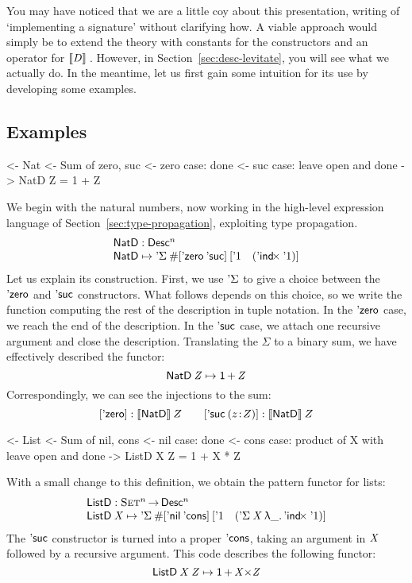 You may have noticed that we are a little coy about this presentation,
writing of `implementing a signature' without clarifying how. A viable
approach would simply be to extend the theory with constants for the
constructors and an operator for \(\descop{\V{D}}\). However, in
Section~\ref{sec:desc-levitate}, you will see what we actually do.  In
the meantime, let us first gain some intuition for its use by
developing some examples.

\subsection{Examples}
\label{sec:desc-examples}

\begin{wstructure}
<- Nat
    <- Sum of zero, suc
    <- zero case: done
    <- suc case: leave open and done
    -> NatD Z = 1 + Z
\end{wstructure}

We begin with the natural numbers, now working in the high-level
expression language of Section~\ref{sec:type-propagation}, exploiting
type propagation.
%
\[\stk{
\NatD : \Desc^n \\
\NatD \mapsto \DSigma{\EnumT{\sqr{\NatZero\: \SYMBNatSuc }}}
                     {\sqr{ \DUnit \quad (\DIndx{\DUnit}) }}
}\]
%
Let us explain its construction. First, we use $\SYMBDSigma$ to
give a choice between the $\NatZero$ and $\SYMBNatSuc$ constructors.
What follows depends on this choice, so we write the function
computing the rest of the description in tuple notation.  In the
$\NatZero$ case, we reach the end of the description. In the
$\SYMBNatSuc$ case, we attach one recursive argument and close the
description. Translating the \(\Sigma\) to a binary sum, we have
effectively described the functor:
%
\[    \NatD\: \V{Z} \mapsto \Unit \mathop{\D{+}} \V{Z}    \]
Correspondingly, we can see the injections to the sum:
\[
\sqr{\NatZero}:\descop{\NatD}Z \qquad
\sqr{\NatSuc{(\Bhab{z}{Z})}}:\descop{\NatD}Z
\]

\begin{wstructure}
<- List
    <- Sum of nil, cons
    <- nil case: done
    <- cons case: product of X with leave open and done
    -> ListD X Z = 1 + X * Z
\end{wstructure}

With a small change to this definition, we obtain the pattern functor
for lists:
%
\[\stk{
\ListD : \Set^n \To \Desc^n \\
\ListD \: \V{X} \mapsto
 \DSigma{\EnumT{\sqr{ \ListNil\: \SYMBListCons }}}
         {\sqr{ \DUnit \quad (\DSigma{\V{X}}{\LAM{\_} \DIndx{\DUnit}}) }}
}\]
%
The $\SYMBNatSuc$ constructor is turned into a proper
$\SYMBListCons$, taking an argument in $\V{X}$ followed by a
recursive argument. This code describes the following functor:
%
\[    \ListD\: \V{X}\: \V{Z} \mapsto \Unit \mathop{\D{+}} \V{X} \D{\ensuremath{\times}} \V{Z}     \]

